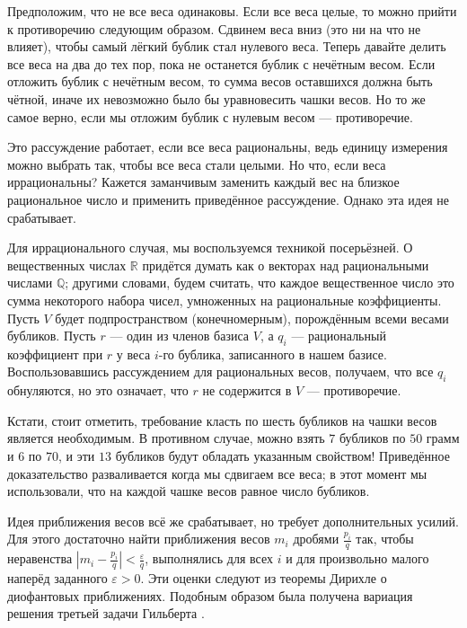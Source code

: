 Предположим, что не все веса одинаковы.
Если все веса целые, то можно прийти к противоречию следующим образом.
Сдвинем веса вниз (это ни на что не влияет), чтобы самый лёгкий бублик стал нулевого веса.
Теперь давайте делить все веса на два до тех пор, пока не останется бублик с нечётным весом.
Если отложить бублик с нечётным весом, то сумма весов оставшихся должна быть чётной, иначе их невозможно было бы уравновесить чашки весов.
Но то же самое верно, если мы отложим бублик с нулевым весом --- противоречие.

Это рассуждение работает, если все веса рациональны, ведь единицу измерения можно выбрать так, чтобы все веса стали целыми.
Но что, если веса иррациональны?
Кажется заманчивым заменить каждый вес на близкое рациональное число и применить приведённое рассуждение.
Однако эта идея не срабатывает.

Для иррационального случая, мы воспользуемся техникой посерьёзней.
О вещественных числах $\mathbb{R}$ придётся думать как о векторах над рациональными числами $\mathbb{Q}$;
другими словами, будем считать, что каждое вещественное число это сумма некоторого набора чисел, умноженных на рациональные коэффициенты.
Пусть $V$ будет подпространством (конечномерным), порождённым всеми весами бубликов.
Пусть $r$ --- один из членов базиса $V$, а $q_i$ --- рациональный коэффициент при $r$ у веса $i$-го бублика, записанного в нашем базисе.
Воспользовавшись рассуждением для рациональных весов, получаем, что все $q_i$ обнуляются, но это означает, что $r$ не содержится в $V$ --- противоречие.

Кстати, стоит отметить, требование класть по шесть бубликов на чашки весов является необходимым.
В противном случае, можно взять $7$ бубликов по $50$ грамм и $6$ по $70$, и эти $13$ бубликов будут обладать указанным свойством!
Приведённое доказательство разваливается когда мы сдвигаем все веса;
в этот момент мы использовали, что на каждой чашке весов равное число бубликов.

\begin{addedbytheeditors}
Идея приближения весов всё же срабатывает, но требует дополнительных усилий.
Для этого достаточно найти приближения весов $m_i$ дробями $\tfrac{p_i}q$ так, чтобы неравенства
$|m_i-\tfrac{p_i}q|<\tfrac\varepsilon q$,
выполнялись для всех $i$ и для произвольно малого наперёд заданного $\varepsilon>0$.
Эти оценки следуют из теоремы Дирихле о диофантовых приближениях.
Подобным образом была получена вариация решения третьей задачи Гильберта \cite{benko}. 
\end{addedbytheeditors}


